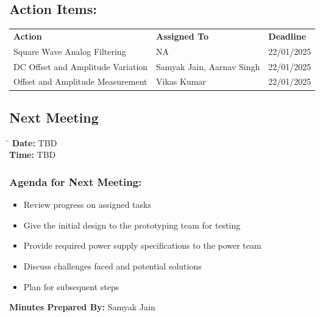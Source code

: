 \documentclass[12pt,a4paper]{article}
\begin{document}
\subsection*{Action Items:}
\renewcommand{\arraystretch}{1.5}
\begin{tabular}{|m{6cm}|m{4cm}|m{4cm}|}
    \hline
    \textbf{Action} & \textbf{Assigned To} & \textbf{Deadline} \\
    
        Square Wave Analog Filtering & NA & 22/01/2025 \\
        \hline
        DC Offset and Amplitude Variation & Samyak Jain, Aarnav Singh & 22/01/2025 \\
        \hline
        Offset and Amplitude Measurement & Vikas Kumar & 22/01/2025 \\
        
     \hline
\end{tabular}




\subsection*{Next Meeting}
\begin{tabbing}
    \hspace{3cm} \= \hspace{10cm} \kill
    \textbf{Date:} \> TBD \\
    \textbf{Time:} \> TBD \\
\end{tabbing}   

\subsubsection*{Agenda for Next Meeting:}
    \begin{itemize}
        \item Review progress on assigned tasks
        \item Give the initial design to the prototyping team for testing
        \item Provide required power supply specifications to the power team
        \item Discuss challenges faced and potential solutions
        \item Plan for subsequent steps
    \end{itemize}



\textbf{Minutes Prepared By:} Samyak Jain
\end{document}
